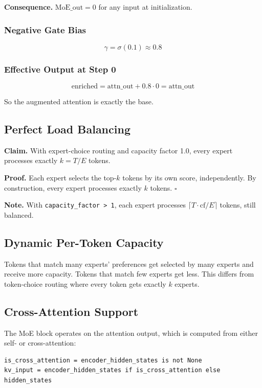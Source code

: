 \textbf{Consequence.} $\text{MoE\_out} = 0$ for any input at initialization.

\subsubsection{Negative Gate Bias}

\[
\gamma = \sigma(0.1) \approx 0.8
\tag{4.13}
\]

\subsubsection{Effective Output at Step 0}

\[
\text{enriched} = \text{attn\_out} + 0.8 \cdot 0 = \text{attn\_out}
\tag{4.14}
\]

So the augmented attention is exactly the base.

\subsection{Perfect Load Balancing}

\textbf{Claim.} With expert-choice routing and capacity factor 1.0, every expert 
processes exactly $k = T / E$ tokens.

\textbf{Proof.} Each expert selects the top-$k$ tokens by its own score, 
independently. By construction, every expert processes exactly $k$ tokens. 
$\square$

\textbf{Note.} With \texttt{capacity\_factor > 1}, each expert processes $\lceil T \cdot 
\text{cf} / E \rceil$ tokens, still balanced.

\subsection{Dynamic Per-Token Capacity}

Tokens that match many experts' preferences get selected by many experts 
and receive more capacity. Tokens that match few experts get less. This 
differs from token-choice routing where every token gets exactly $k$ 
experts.

\subsection{Cross-Attention Support}

The MoE block operates on the attention output, which is computed from 
either self- or cross-attention:

\begin{lstlisting}
is_cross_attention = encoder_hidden_states is not None
kv_input = encoder_hidden_states if is_cross_attention else hidden_states
\end{lstlisting}

